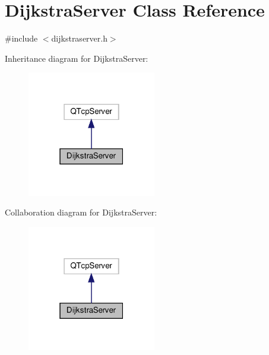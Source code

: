 \hypertarget{class_dijkstra_server}{}\section{Dijkstra\+Server Class Reference}
\label{class_dijkstra_server}


{\ttfamily \#include $<$dijkstraserver.\+h$>$}



Inheritance diagram for Dijkstra\+Server\+:
\nopagebreak
\begin{figure}[H]
\begin{center}
\leavevmode
\includegraphics[width=159pt]{class_dijkstra_server__inherit__graph}
\end{center}
\end{figure}


Collaboration diagram for Dijkstra\+Server\+:
\nopagebreak
\begin{figure}[H]
\begin{center}
\leavevmode
\includegraphics[width=159pt]{class_dijkstra_server__coll__graph}
\end{center}
\end{figure}
